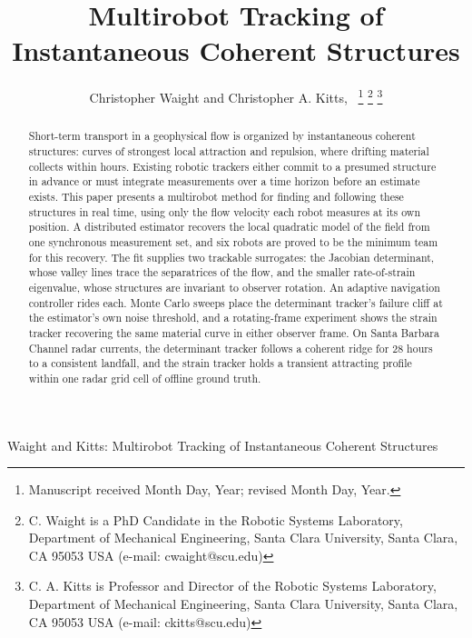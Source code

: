 \documentclass[lettersize,journal]{IEEEtran}
\begin{document}
\title{Multirobot Tracking of
Instantaneous Coherent Structures}

\author{Christopher Waight and Christopher A. Kitts,~
\thanks{Manuscript received Month Day, Year; revised Month Day, Year.}
\thanks{C. Waight is a PhD Candidate in the Robotic Systems Laboratory, Department of Mechanical
Engineering, Santa Clara University, Santa Clara, CA 95053 USA (e-mail: cwaight@scu.edu)}
\thanks{C. A. Kitts is Professor and Director of the Robotic Systems Laboratory, Department of
Mechanical Engineering, Santa Clara University, Santa Clara, CA 95053 USA (e-mail: ckitts@scu.edu)}
}
%
{Waight and Kitts: Multirobot Tracking of Instantaneous Coherent Structures}

\maketitle

\begin{abstract}
Short-term transport in a geophysical flow is organized by
instantaneous coherent structures: curves of strongest local attraction
and repulsion, where drifting material collects within hours. Existing
robotic trackers either commit to a presumed structure in advance or
must integrate measurements over a time horizon before an estimate
exists. This paper presents a multirobot method for finding and
following these structures in real time, using only the flow velocity
each robot measures at its own position. A distributed estimator
recovers the local quadratic model of the field from one synchronous
measurement set, and six robots are proved to be the minimum team for
this recovery. The fit supplies two trackable surrogates: the Jacobian
determinant, whose valley lines trace the separatrices of the flow, and
the smaller rate-of-strain eigenvalue, whose structures are invariant
to observer rotation. An adaptive navigation controller rides each.
Monte Carlo sweeps place the determinant tracker's failure cliff at the
estimator's own noise threshold, and a rotating-frame experiment shows
the strain tracker recovering the same material curve in either
observer frame. On Santa Barbara Channel radar currents, the
determinant tracker follows a coherent ridge for 28 hours to a
consistent landfall, and the strain tracker holds a transient
attracting profile within one radar grid cell of offline ground truth.
\end{abstract}
\end{document}
